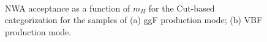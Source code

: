 \begin{figure}[h]
\centering
{}
\\
\caption{NWA acceptance as a function of $m_{H}$ for the Cut-based categorization for the samples of
(a) ggF production mode;
(b) VBF production mode. }
\label{fig:hmhzz_acc_cut}
\end{figure}

